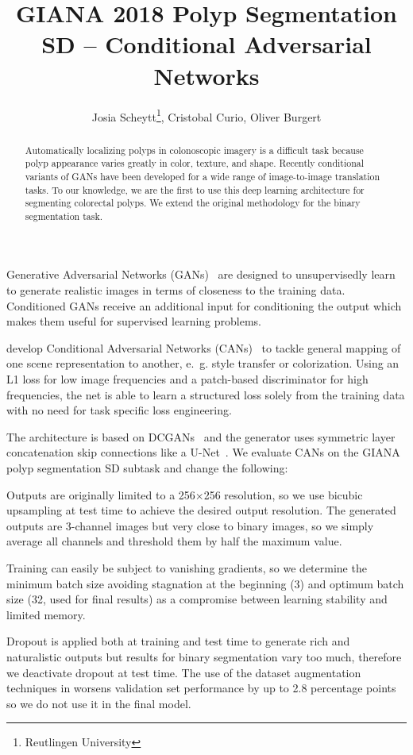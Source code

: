 \documentclass[12pt]{article}
\title{GIANA 2018 Polyp Segmentation SD -- Conditional Adversarial Networks}
\author{Josia Scheytt\thanks{Reutlingen University}, Cristobal Curio\footnotemark[1], Oliver Burgert\footnotemark[1]}
\begin{document}
\maketitle

\begin{abstract}
Automatically localizing polyps in colonoscopic imagery is a difficult task because polyp appearance varies greatly in color, texture, and shape.
Recently conditional variants of GANs have been developed for a wide range of image-to-image translation tasks.
To our knowledge, we are the first to use this deep learning architecture for segmenting colorectal polyps.
We extend the original methodology for the binary segmentation task.
\end{abstract}

Generative Adversarial Networks (GANs)~\cite{Goodfellow.2014} are designed to unsupervisedly learn to generate realistic images in terms of closeness to the training data.
Conditioned GANs receive an additional input for conditioning the output which makes them useful for supervised learning problems.

\citeauthor{Isola.2017} develop Conditional Adversarial Networks (CANs)~\cite{Isola.2017} to tackle general mapping of one scene representation to another, e.~g. style transfer or colorization.
Using an L1 loss for low image frequencies and a patch-based discriminator for high frequencies, the net is able to learn a structured loss solely from the training data with no need for task specific loss engineering.

The architecture is based on DCGANs~\cite{Radford.2016} and the generator uses symmetric layer concatenation skip connections like a U-Net~\cite{Ronneberger.2015}.
We evaluate CANs on the GIANA polyp segmentation SD subtask and change the following:

Outputs are originally limited to a 256$\times$256 resolution, so we use bicubic upsampling at test time to achieve the desired output resolution.
The generated outputs are 3-channel images but very close to binary images, so we simply average all channels and threshold them by half the maximum value.

Training can easily be subject to vanishing gradients, so we determine the minimum batch size avoiding stagnation at the beginning (3) and optimum batch size (32, used for final results) as a compromise between learning stability and limited memory.

Dropout is applied both at training and test time to generate rich and naturalistic outputs but results for binary segmentation vary too much, therefore we deactivate dropout at test time.
The use of the dataset augmentation techniques in \cite{Vazquez.2017} worsens validation set performance by up to 2.8 percentage points so we do not use it in the final model.

\printbibliography
\end{document}
